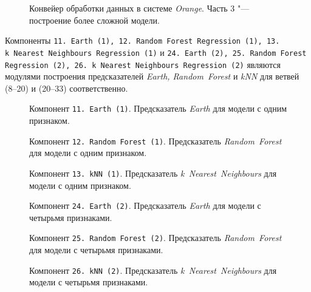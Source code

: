 \begin{figure}[tbp]
    \caption{Конвейер обработки данных в системе \textit{Orange}. Часть 3 "--- построение более сложной модели.}
    \label{img:series30-4}
\end{figure}

Компоненты \texttt{11.\,Earth~(1), 12.\,Random~Forest Regression~(1), 13.\,k~Nearest~Neighbours Regression~(1)} и \texttt{24.\,Earth~(2), 25.~Random~Forest Regression~(2), 26.\,k~Nearest~Neighbours Regression~(2)} являются модулями построения предсказателей \textit{Earth, Random~Forest} и \textit{kNN} для ветвей (8--20) и (20--33) соответственно.

\begin{figure}[tbp]
    \caption{Компонент \texttt{11.\,Earth~(1)}. Предсказатель \textit{Earth} для модели с одним признаком.}
    \label{img:11-Earth-1}
\end{figure}

\begin{figure}[tbp]
    \center{\texttt{[image: 12-RF-1]}}
    \caption{Компонент \texttt{12.\,Random~Forest~(1)}. Предсказатель \textit{Random~Forest} для модели с одним признаком.}
    \label{img:12-RF-1}
\end{figure}

\begin{figure}[tbp]
    \caption{Компонент \texttt{13.\,kNN~(1)}. Предсказатель \textit{k~Nearest~Neighbours} для модели с одним признаком.}
    \label{img:13-kNN-1}
\end{figure}

\begin{figure}[tbp]
    \caption{Компонент \texttt{24.\,Earth~(2)}. Предсказатель \textit{Earth} для модели с четырьмя признаками.}
    \label{img:24-Earth-2}
\end{figure}

\begin{figure}[tbp]
    \center{\texttt{[image: 25-RF-2]}}
    \caption{Компонент \texttt{25.\,Random~Forest~(2)}. Предсказатель \textit{Random~Forest} для модели с четырьмя признаками.}
    \label{img:25-RF-2}
\end{figure}

\begin{figure}[tbp]
    \caption{Компонент \texttt{26.\,kNN~(2)}. Предсказатель \textit{k~Nearest~Neighbours} для модели с четырьмя признаками.}
    \label{img:26-kNN-2}
\end{figure}

